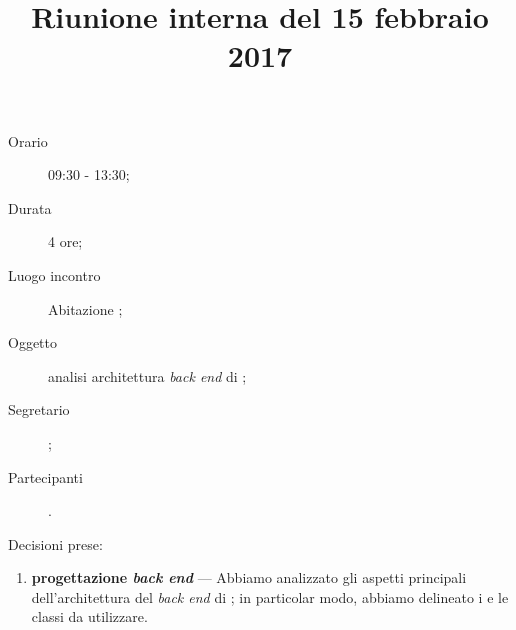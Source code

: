 


\author{\LS}
\supervisor{\LB}
\dest{\ALL}
\title{Riunione interna del 15 febbraio 2017}



\maketitle

\begin{description}
	\item[Orario] 09:30 - 13:30;
	\item[Durata] 4 ore;
	\item[Luogo incontro] Abitazione \GG;
	\item[Oggetto] analisi architettura \emph{back end} di \proj;
	\item[Segretario] \LS; 
	\item[Partecipanti] \ALL.
\end{description}

Decisioni prese:
\begin{enumerate}
	\item \textbf{progettazione \emph{back end}} --- Abbiamo analizzato gli aspetti principali dell'architettura del \emph{back end} di \proj; in particolar modo, abbiamo delineato i  e le classi da utilizzare.
\end{enumerate}


